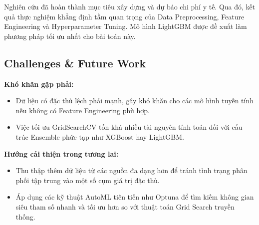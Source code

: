 Nghiên cứu đã hoàn thành mục tiêu xây dựng và dự báo chi phí y tế. Qua đó, kết quả thực nghiệm khẳng định tầm quan trọng của Data Preprocessing, Feature Engineering và Hyperparameter Tuning. Mô hình LightGBM được đề xuất làm phương pháp tối ưu nhất cho bài toán này.

\subsection{Challenges \& Future Work}
\textbf{Khó khăn gặp phải:}
\begin{itemize}
    \item Dữ liệu có đặc thù lệch phải mạnh, gây khó khăn cho các mô hình tuyến tính nếu không có Feature Engineering phù hợp.
    \item Việc tối ưu GridSearchCV tốn khá nhiều tài nguyên tính toán đối với cấu trúc Ensemble phức tạp như XGBoost hay LightGBM.
\end{itemize}

\textbf{Hướng cải thiện trong tương lai:}
\begin{itemize}
    \item Thu thập thêm dữ liệu từ các nguồn đa dạng hơn để tránh tình trạng phân phối tập trung vào một số cụm giá trị đặc thù.
    \item Áp dụng các kỹ thuật AutoML tiên tiến như Optuna để tìm kiếm không gian siêu tham số nhanh và tối ưu hơn so với thuật toán Grid Search truyền thống.
\end{itemize}
